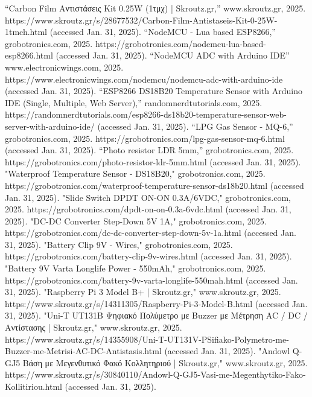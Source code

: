 \documentclass[conference]{IEEEtran}
\begin{document}
 \enlargethispage{-120mm}
\begin{thebibliography}{00}
	 “Carbon Film Αντιστάσεις Kit 0.25W (1τμχ) | Skroutz.gr,” www.skroutz.gr, 2025. https://www.skroutz.gr/s/28677532/Carbon-Film-Antistaseis-Kit-0-25W-1tmch.html (accessed Jan. 31, 2025).
	 “NodeMCU - Lua based ESP8266,” grobotronics.com, 2025. https://grobotronics.com/nodemcu-lua-based-esp8266.html (accessed Jan. 31, 2025).
	 “NodeMCU ADC with Arduino IDE” www.electronicwings.com, 2025. https://www.electronicwings.com/nodemcu/nodemcu-adc-with-arduino-ide (accessed Jan. 31, 2025).
	 “ESP8266 DS18B20 Temperature Sensor with Arduino IDE (Single, Multiple, Web Server),” randomnerdtutorials.com, 2025. https://randomnerdtutorials.com/esp8266-ds18b20-temperature-sensor-web-server-with-arduino-ide/ (accessed Jan. 31, 2025).
	 “LPG Gas Sensor - MQ-6,” grobotronics.com, 2025. https://grobotronics.com/lpg-gas-sensor-mq-6.html (accessed Jan. 31, 2025).
	 “Photo resistor LDR 5mm,” grobotronics.com, 2025. https://grobotronics.com/photo-resistor-ldr-5mm.html (accessed Jan. 31, 2025).
	 "Waterproof Temperature Sensor - DS18B20," grobotronics.com, 2025. https://grobotronics.com/waterproof-temperature-sensor-ds18b20.html (accessed Jan. 31, 2025).
	 "Slide Switch DPDT ON-ON 0.3A/6VDC," grobotronics.com, 2025. https://grobotronics.com/dpdt-on-on-0.3a-6vdc.html (accessed Jan. 31, 2025).
	 "DC-DC Converter Step-Down 5V 1A," grobotronics.com, 2025. https://grobotronics.com/dc-dc-converter-step-down-5v-1a.html (accessed Jan. 31, 2025).
	 "Battery Clip 9V - Wires," grobotronics.com, 2025. https://grobotronics.com/battery-clip-9v-wires.html (accessed Jan. 31, 2025).
	 "Battery 9V Varta Longlife Power - 550mAh," grobotronics.com, 2025. https://grobotronics.com/battery-9v-varta-longlife-550mah.html (accessed Jan. 31, 2025).
	 "Raspberry Pi 3 Model B+ | Skroutz.gr," www.skroutz.gr, 2025. https://www.skroutz.gr/s/14311305/Raspberry-Pi-3-Model-B.html (accessed Jan. 31, 2025).
	 "Uni-T UT131Β Ψηφιακό Πολύμετρο με Buzzer με Μέτρηση AC / DC / Αντίστασης | Skroutz.gr," www.skroutz.gr, 2025. https://www.skroutz.gr/s/14355908/Uni-T-UT131V-PSifiako-Polymetro-me-Buzzer-me-Metrisi-AC-DC-Antistasis.html (accessed Jan. 31, 2025).
	 "Andowl Q-GJ5 Βάση με Μεγενθυτικό Φακό Κολλητηριού | Skroutz.gr," www.skroutz.gr, 2025. https://www.skroutz.gr/s/30840110/Andowl-Q-GJ5-Vasi-me-Megenthytiko-Fako-Kollitiriou.html (accessed Jan. 31, 2025).

\end{thebibliography}
\end{document}

